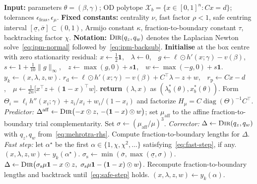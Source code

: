 \documentclass[12pt]{article}
\newcommand{\cX}{\mathcal{X}}
\begin{document}
\begin{algorithm}[ht]
\caption{Inner solver for the PURC subproblem~\eqref{eq:inner-problem}}\label{alg:inner}
\begin{algorithmic}[1]
\Statex \textbf{Input:} parameters $\theta=(\beta,\gamma)$; OD polytope $\cX_b=\{x\in[0,1]^n:Cx=d\}$; tolerances $\epsilon_{\mathrm{feas}},\epsilon_\mu$.
\Statex \textbf{Fixed constants:} centrality $\nu$, fast factor $\rho<1$, safe centring interval $[\underline\sigma,\overline\sigma]\subset(0,1)$, Armijo constant $\kappa$, fraction-to-boundary constant $\tau$, backtracking factor $\chi$.
\Statex \textbf{Notation:} $\textsc{Dir}(q_z,q_w)$ denotes the Laplacian Newton solve~\eqref{eq:ipm-normal} followed by~\eqref{eq:ipm-backsub}.
\State \textbf{Initialise} at the box centre with zero stationarity residual:
\Statex \quad $x\gets\tfrac12\mathbf 1$,\ \ $\lambda\gets0$,\ \ $g\gets\ell\odot h'(x;\gamma)-v(\beta)$,\ \ $s\gets1+\tfrac1{10}\|g\|_\infty$,\ \ $z\gets\max(g,0)+s\mathbf 1$,\ \ $w\gets\max(-g,0)+s\mathbf 1$.
    \State $y_k\gets(x,\lambda,z,w)$.
    \State $r_{\mathrm d}\gets\ell\odot h'(x;\gamma)-v(\beta)+C^\top\lambda-z+w$,\ \ $r_{\mathrm p}\gets Cx-d$,\ \ $\mu\gets\tfrac1{2n}\bigl[x^\top z+(\mathbf 1-x)^\top w\bigr]$.
        \State \textbf{return} $(\lambda,x)$ as $(\lambda_b^*(\theta),x_b^*(\theta))$.
    \EndIf
    \State Form $\Theta_i=\ell_i h''(x_i;\gamma)+z_i/x_i+w_i/(1-x_i)$ and factorize $H_\mu=C\operatorname{diag}(\Theta)^{-1}C^\top$.
    \State \emph{Predictor:} $\Delta^{\mathrm{aff}}\gets\textsc{Dir}\bigl(-x\odot z,\,-(\mathbf 1-x)\odot w\bigr)$; set $\mu_{\mathrm{aff}}$ to the affine fraction-to-boundary trial complementarity.
    \State Set $\sigma\gets(\mu_{\mathrm{aff}}/\mu)^3$.
    \State \emph{Corrector:} $\Delta\gets\textsc{Dir}(q_z,q_w)$ with $q_z,q_w$ from~\eqref{eq:mehrotra-rhs}.
    \State Compute fraction-to-boundary lengths for $\Delta$.
    \State \emph{Fast step:} let $\alpha^\star$ be the first $\alpha\in\{1,\chi,\chi^2,\ldots\}$ satisfying~\eqref{eq:fast-step}, if any.
        \State $(x,\lambda,z,w)\gets y_k(\alpha^\star)$.
    \Else
        \State $\sigma_{\mathrm s}\gets\min(\overline\sigma,\max(\underline\sigma,\sigma))$.
        \State $\Delta\gets\textsc{Dir}\bigl(\sigma_{\mathrm s}\mu\mathbf 1-x\odot z,\ \sigma_{\mathrm s}\mu\mathbf 1-(\mathbf 1-x)\odot w\bigr)$.
        \State Recompute fraction-to-boundary lengths and backtrack until~\eqref{eq:safe-step} holds.
        \State $(x,\lambda,z,w)\gets y_k(\alpha)$.
    \EndIf
\EndFor
\end{algorithmic}
\end{algorithm}
\end{document}
